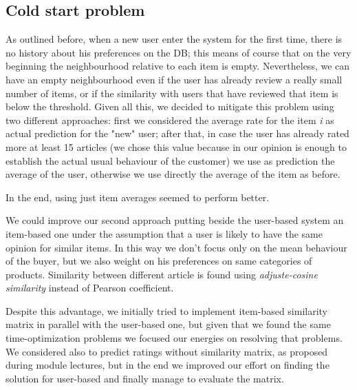 \subsection{Cold start problem}
As outlined before, when a new user enter the system for the first time, there is no history about his preferences on the DB; this means of course that on the very beginning the neighbourhood relative to each item is empty.  
Nevertheless, we can have an empty neighbourhood even if the user has already review a really small number of items, or if the similarity with users that have reviewed that item is below the threshold. Given all this, we decided to mitigate this problem using two different approaches: first we considered the average rate for the item \textit{i} as actual prediction for the "new" user; after that, in case the user has already rated more at least 15 articles (we chose this value because in our opinion is enough to establish the actual usual behaviour of the customer) we use as prediction the average of the user, otherwise we use directly the average of the item as before.

In the end, using just item averages seemed to perform better.

We could improve our second approach putting beside the user-based system an item-based one under the assumption that a user is likely to have the same opinion for similar items. In this way we don't focus only on the mean behaviour of the buyer, but we also weight on his preferences on same categories of products. Similarity between different article is found using \textit{adjuste-cosine similarity} instead of Pearson coefficient.

Despite this advantage, we initially tried to implement item-based similarity matrix in parallel with the user-based one, but given that we found the same time-optimization problems we focused our energies on resolving that problems. We considered also to predict ratings without similarity matrix, as proposed during module lectures, but in the end we improved our effort on finding the solution for user-based and finally manage to evaluate the matrix.